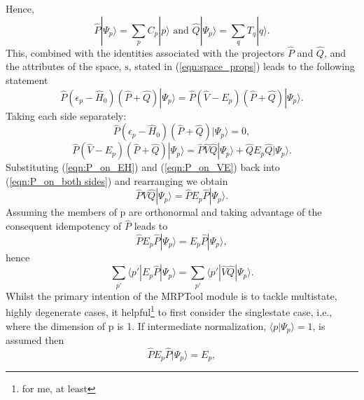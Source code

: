 Hence,
\begin{equation}
\hat{P} | \Psi_{p} \rangle  = \sum_{p} C_{p}|p\rangle
\text{ \ \ \ \  and \ \ \ \ }
\hat{Q} | \Psi_{p} \rangle  = \sum_{q} T_{q}|q\rangle .
\end{equation}
This, combined with the identities associated with the projectors $\hat{P}$ and $\hat{Q}$, and the
attributes of the space, $\mathrm{s}$, stated in (\ref{eqn:space_props}) leads to the following statement
\begin{equation}
\hat{P}(\epsilon_{p} - \hat{H}_{0})(\hat{P}+\hat{Q})| \Psi_{p} \rangle  =  \hat{P}(\hat{V}-E_{p})(\hat{P}+\hat{Q})|\Psi_{p} \rangle .
\label{eqn:P_on_both sides}
\end{equation}
Taking each side separately:
\begin{equation}
\hat{P}(\epsilon_{p} - \hat{H}_{0})(\hat{P}+\hat{Q})| \Psi_{p} \rangle  = 0  ,
\label{eqn:P_on_EH}
\end{equation}
\begin{equation}
\hat{P}(\hat{V}-E_{p})(\hat{P}+\hat{Q})|\Psi_{p} \rangle = \hat{P}\hat{V}\hat{Q}|\Psi_{p} \rangle + \hat{Q}E_{p}\hat{Q}|\Psi_{p}\rangle .
\label{eqn:P_on_VE}
\end{equation}
Substituting (\ref{eqn:P_on_EH}) and (\ref{eqn:P_on_VE}) back into (\ref{eqn:P_on_both sides}) and rearranging we obtain
\begin{equation}
\hat{P}\hat{V}\hat{Q}|\Psi_{p} \rangle =  \hat{P}E_{p}\hat{P}|\Psi_{p}\rangle .
\label{eqn:pt_energy}
\end{equation}
Assuming the members of $\mathrm{p}$ are orthonormal and taking advantage of the consequent idempotency of $\hat{P}$ leads to
\begin{equation}
\hat{P}E_{p}\hat{P}|\Psi_{p}\rangle = E_{p}\hat{P}|\Psi_{p} \rangle ,
\end{equation}
hence
\begin{equation}
\sum_{p'} \langle p' | E_{p}\hat{P}|\Psi_{p} \rangle  =  \sum_{p'} \langle p' | \hat{V}\hat{Q}|\Psi_{p} \rangle.
\label{eqn:multistate_pt_energy}
\end{equation}
Whilst the primary intention of the MRPTool module is to tackle multistate, highly degenerate cases, it helpful\footnote{for me, at least} 
to first consider the singlestate case, i.e., where the dimension of $\mathrm{p}$ is 1. 
If intermediate normalization, $\langle p | \Psi_{p} \rangle = 1$, is assumed then 
\begin{equation}
\hat{P}E_{p}\hat{P}|\Psi_{p}\rangle = E_{p},
\end{equation}
